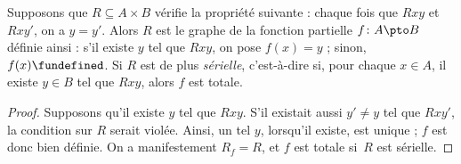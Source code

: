 \documentclass[../../../include/open-logic-section]{subfiles}
\begin{document}
\begin{prop}
Supposons que $R \subseteq A \times B$ vérifie la propriété suivante :
chaque fois que $Rxy$ et $Rxy'$, on a $y = y'$.
Alors $R$ est le graphe de la fonction partielle $f\colon A \pto B$
définie ainsi : s’il existe $y$ tel que $Rxy$, on pose $f(x) = y$ ;
sinon, $f(x) \fundefined$. Si $R$ est de plus \emph{sérielle},
c’est-à-dire si, pour chaque $x \in A$, il existe $y \in B$ tel que
$Rxy$, alors $f$ est totale.
\end{prop}

\begin{proof}
Supposons qu’il existe $y$ tel que $Rxy$. S’il existait aussi $y' \neq y$
tel que $Rxy'$, la condition sur $R$ serait violée. Ainsi, un tel $y$,
lorsqu’il existe, est unique ; $f$ est donc bien définie.
On a manifestement $R_f = R$, et $f$ est totale si~$R$ est sérielle.
\end{proof}
\end{document}
